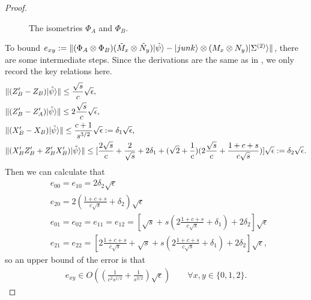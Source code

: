 \documentclass[11pt,letterpaper]{article}
\newcommand{\ket}[1]{|#1\rangle}
\newcommand{\x}{\otimes}
\DeclarePairedDelimiter{\norm}{\lVert}{\rVert}
\newcommand{\1}{\mathbb{1}}
\newcommand{\EPR}[1]{\Sigma^{(#1)}}
\newcommand{\tM}{\tilde{M}}
\newcommand{\tN}{\tilde{N}}
\newcommand{\tpsi}{\tilde{\psi}}
\theoremstyle{definition}
\begin{document}
\begin{proof}
\begin{figure}[H]
	\caption{The isometries $\Phi_A$ and $\Phi_B$.}
\end{figure}
To bound $e_{xy} := \norm{ (\Phi_A\x\Phi_B) (\tM_x \x \tN_y) \ket{\tpsi} - \ket{junk} \x (M_x\x N_y) \ket{\EPR{2}}}$,
there are some intermediate steps. Since the derivations are the same as in \cite{bamps2015}, 
we only record the key relations here.
\begin{align*}
	&\norm{(Z_B' - Z_B) \ket{\tpsi}} \leq \frac{\sqrt{s}}{c} \sqrt{\epsilon},\\
	&\norm{(Z_B' - Z_A') \ket{\tpsi}} \leq 2 \frac{\sqrt{s}}{c}\sqrt{\epsilon}, \\
	&\norm{(X_B' - X_B) \ket{\tpsi}} \leq \frac{c+1}{s^{3/2}} \sqrt{\epsilon} := \delta_1 \sqrt{\epsilon},\\
	&\norm{(X_B'Z_B'+ Z_B'X_B')\ket{\tpsi}} \leq [\frac{2\sqrt{s}}{c} + \frac{2}{\sqrt{s}} + 2\delta_1 + 
	(\sqrt{2}+\frac{1}{c})(2\frac{\sqrt{s}}{c}+\frac{1+c+s}{c\sqrt{s}})]\sqrt{\epsilon}
	:= \delta_2 \sqrt{\epsilon}.
\end{align*}
Then we can calculate that 
\begin{align*}
	&e_{00} = e_{10} = 2\delta_2 \sqrt{\epsilon}\\
	&e_{20} = 2(\frac{1+c+s}{c\sqrt{s}} + \delta_2) \sqrt{\epsilon}\\
	&e_{01} = e_{02} = e_{11} = e_{12} = [\sqrt{s}+s(2\frac{1+c+s}{c\sqrt{s}} + \delta_1) + 2\delta_2]\sqrt{\epsilon}\\
	&e_{21} = e_{22} = [2\frac{1+c+s}{c\sqrt{s}} + \sqrt{s}+s(2\frac{1+c+s}{c\sqrt{s}} + \delta_1) + 2\delta_2]\sqrt{\epsilon},
\end{align*}
so an upper bound of the error is that
\begin{align}
 e_{xy} \in O((\frac{1}{c^2s^{1/2}} + \frac{1}{s^{3/2}})\sqrt{\epsilon})
 \quad\quad 
 \forall x,y \in \{0,1,2\}.
\end{align}
\end{proof}
\end{document}
